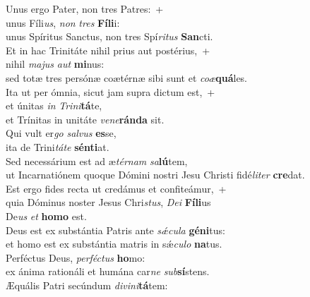 \oddverse Unus ergo Pater, non tres Patres:~+\\
\oddverse  unus Fíli\textit{us}, \textit{non} \textit{tres} \textbf{Fí}\textbf{li}i:~\*\\
\oddverse unus Spíritus Sanctus, non tres Spí\textit{ri}\textit{tus} \textbf{San}cti.\\
\evenverse Et in hac Trinitáte nihil prius aut postérius,~+\\
\evenverse  nihil \textit{ma}\textit{jus} \textit{aut} \textbf{mi}nus:~\*\\
\evenverse sed totæ tres persónæ coætérnæ sibi sunt et \textit{co}\textit{æ}\textbf{quá}les.\\
\oddverse Ita ut per ómnia, sicut jam supra dictum est,~+\\
\oddverse  et únitas \textit{in} \textit{Tri}\textit{ni}\textbf{tá}te,~\*\\
\oddverse et Trínitas in unitáte \textit{ve}\textit{ne}\textbf{rán}\textbf{da} sit.\\
\evenverse Qui vult er\textit{go} \textit{sal}\textit{vus} \textbf{es}se,~\*\\
\evenverse ita de Trini\textit{tá}\textit{te} \textbf{sén}\textbf{ti}at.\\
\oddverse Sed necessárium est ad æ\textit{tér}\textit{nam} \textit{sa}\textbf{lú}tem,~\*\\
\oddverse ut Incarnatiónem quoque Dómini nostri Jesu Christi fidé\textit{li}\textit{ter} \textbf{cre}dat.\\
\evenverse Est ergo fides recta ut credámus et confiteámur,~+\\
\evenverse  quia Dóminus noster Jesus Chri\textit{stus}, \textit{De}\textit{i} \textbf{Fí}\textbf{li}us~\*\\
\evenverse De\textit{us} \textit{et} \textbf{ho}\textbf{mo} est.\\
\oddverse Deus est ex substántia Patris ante \textit{sǽ}\textit{cu}\textit{la} \textbf{gé}\textbf{ni}tus:~\*\\
\oddverse et homo est ex substántia matris in sǽ\textit{cu}\textit{lo} \textbf{na}tus.\\
\evenverse Perféctus Deus, \textit{per}\textit{fé}\textit{ctus} \textbf{ho}mo:~\*\\
\evenverse ex ánima rationáli et humána car\textit{ne} \textit{sub}\textbf{sí}stens.\\
\oddverse Æquális Patri secúndum \textit{di}\textit{vi}\textit{ni}\textbf{tá}tem:~\*\\
